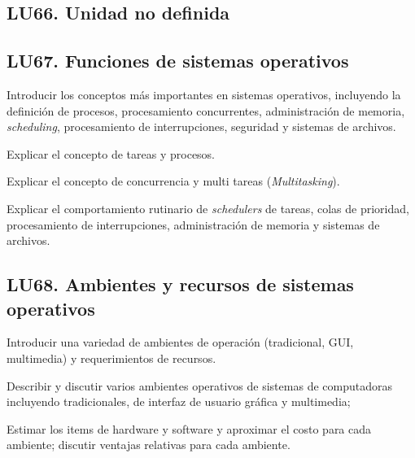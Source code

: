 \subsection{LU66. Unidad no definida}\label{sec:LU66}
\subsection{LU67. Funciones de sistemas operativos}\label{sec:LU67}
\begin{LearningUnit}
\begin{LUGoal}
\item Introducir los conceptos más importantes en sistemas operativos, incluyendo la definición de procesos, procesamiento concurrentes, administración de memoria, {\it scheduling}, procesamiento de interrupciones, seguridad y sistemas de archivos.
\end{LUGoal}

\begin{LUObjective}
\item Explicar el concepto de tareas y procesos.
\item Explicar el concepto de concurrencia y multi tareas ({\it Multitasking}).
\item Explicar el comportamiento rutinario de {\it schedulers} de tareas, colas de prioridad, procesamiento de interrupciones, administración de memoria y sistemas de archivos.
\end{LUObjective}
\end{LearningUnit}

\subsection{LU68. Ambientes y recursos de sistemas operativos}\label{sec:LU68}
\begin{LearningUnit}
\begin{LUGoal}
\item Introducir una variedad de ambientes de operación (tradicional, GUI, multimedia) y requerimientos de recursos.
\end{LUGoal}

\begin{LUObjective}
\item Describir y discutir varios ambientes operativos de sistemas de computadoras incluyendo tradicionales, de interfaz de usuario gráfica y multimedia;
\item Estimar los items de hardware y software y aproximar el costo para cada ambiente; discutir ventajas relativas para cada ambiente.
\end{LUObjective}
\end{LearningUnit}


